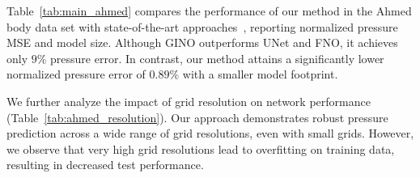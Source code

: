 Table~\ref{tab:main_ahmed} compares the performance of our method in the Ahmed body data set with state-of-the-art approaches~\cite{li2023geometry}, reporting normalized pressure MSE and model size. Although GINO outperforms UNet and FNO, it achieves only $9\%$ pressure error. In contrast, our method attains a significantly lower normalized pressure error of $0.89\%$ with a smaller model footprint.

We further analyze the impact of grid resolution on network performance (Table~\ref{tab:ahmed_resolution}). Our approach demonstrates robust pressure prediction across a wide range of grid resolutions, even with small grids. However, we observe that very high grid resolutions lead to overfitting on training data, resulting in decreased test performance.

